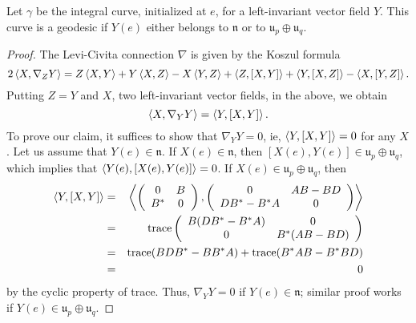\begin{lemma}
    Let $\gamma$ be the integral curve, initialized at $e$, for a left-invariant vector field $Y$. This curve is a geodesic if $Y(e)$ either belongs to $\mathfrak{n}$ or to $\mathfrak{u}_p\oplus\mathfrak{u}_q$.
\end{lemma}
\begin{proof}
    The Levi-Civita connection $\nabla$ is given by the Koszul formula
    \begin{displaymath}
        2\left\langle X,\nabla_Z Y\right\rangle = Z\left\langle X,Y\right\rangle+Y\left\langle X,Z\right\rangle -X\left\langle Y,Z\right\rangle +\left\langle Z,[X,Y]\right\rangle+\left\langle Y,[X,Z]\right\rangle - \left\langle X,[Y,Z]\right\rangle. 
    \end{displaymath}
    Putting $Z=Y$ and $X$, two left-invariant vector fields, in the above, we obtain
    \begin{displaymath}
        \left\langle X, \nabla_Y Y\right\rangle = \left\langle Y, [X,Y]\right\rangle.
    \end{displaymath}
    To prove our claim, it suffices to show that $\nabla_Y Y=0$, ie, $\left\langle Y, [X,Y]\right\rangle=0$ for any $X$. Let us assume that $Y(e)\in\mathfrak{n}$. If $X(e)\in\mathfrak{n}$, then $[X(e),Y(e)]\in \mathfrak{u}_p\oplus\mathfrak{u}_q$, which implies that $\left\langle Y(e), [X(e),Y(e)]\right\rangle=0$. If $X(e)\in \mathfrak{u}_p\oplus\mathfrak{u}_q$, then
    \begin{eqnarray*}
        \left\langle Y, [X,Y]\right\rangle & = &  \left\langle\left(\begin{array}{cc}
        0 & B\\
        B^\ast & 0
        \end{array}\right), \left(\begin{array}{cc}
        0 & AB-BD\\
        DB^\ast-B^\ast A & 0
        \end{array}\right)\right\rangle\\
        & = & \textup{trace}\left(\begin{array}{cc}
        B(DB^\ast-B^\ast A) & 0\\
        0 & B^\ast(AB-BD)
        \end{array}\right)\\
        & = & \textup{trace}(BDB^\ast-BB^\ast A)+\textup{trace}(B^\ast AB-B^\ast BD)\\
        & = & 0
    \end{eqnarray*}
    by the cyclic property of trace. Thus, $\nabla_Y Y=0$ if $Y(e)\in\mathfrak{n}$; similar proof works if $Y(e)\in \mathfrak{u}_p\oplus\mathfrak{u}_q$. 
\end{proof}

